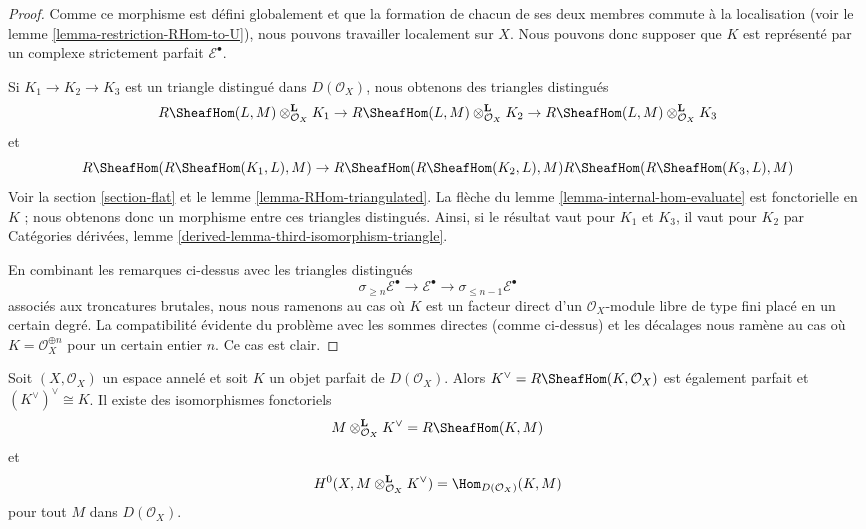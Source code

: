 \begin{proof}
Comme ce morphisme est défini globalement et que la formation de chacun de ses deux membres commute à la localisation (voir le lemme \ref{lemma-restriction-RHom-to-U}), nous pouvons travailler localement sur $X$. Nous pouvons donc supposer que $K$ est représenté par un complexe strictement parfait $\mathcal{E}^\bullet$.

\medskip\noindent
Si $K_1 \to K_2 \to K_3$ est un triangle distingué dans $D(\mathcal{O}_X)$, nous obtenons des triangles distingués $$
R\SheafHom(L, M) \otimes_{\mathcal{O}_X}^\mathbf{L} K_1 \to
R\SheafHom(L, M) \otimes_{\mathcal{O}_X}^\mathbf{L} K_2 \to
R\SheafHom(L, M) \otimes_{\mathcal{O}_X}^\mathbf{L} K_3
$$ et $$
R\SheafHom(R\SheafHom(K_1, L), M) \to
R\SheafHom(R\SheafHom(K_2, L), M)
R\SheafHom(R\SheafHom(K_3, L), M)
$$ Voir la section \ref{section-flat} et le lemme \ref{lemma-RHom-triangulated}. La flèche du lemme \ref{lemma-internal-hom-evaluate} est fonctorielle en $K$ ; nous obtenons donc un morphisme entre ces triangles distingués. Ainsi, si le résultat vaut pour $K_1$ et $K_3$, il vaut pour $K_2$ par Catégories dérivées, lemme \ref{derived-lemma-third-isomorphism-triangle}.

\medskip\noindent
En combinant les remarques ci-dessus avec les triangles distingués $$
\sigma_{\geq n}\mathcal{E}^\bullet \to \mathcal{E}^\bullet \to
\sigma_{\leq n - 1}\mathcal{E}^\bullet
$$ associés aux troncatures brutales, nous nous ramenons au cas où $K$ est un facteur direct d'un $\mathcal{O}_X$-module libre de type fini placé en un certain degré. La compatibilité évidente du problème avec les sommes directes (comme ci-dessus) et les décalages nous ramène au cas où $K = \mathcal{O}_X^{\oplus n}$ pour un certain entier $n$. Ce cas est clair.
\end{proof}

\begin{lemma}

\label{lemma-dual-perfect-complex}
Soit $(X, \mathcal{O}_X)$ un espace annelé et soit $K$ un objet parfait de $D(\mathcal{O}_X)$. Alors $K^\vee = R\SheafHom(K, \mathcal{O}_X)$ est également parfait et $(K^\vee)^\vee \cong K$. Il existe des isomorphismes fonctoriels $$
M \otimes^\mathbf{L}_{\mathcal{O}_X} K^\vee = R\SheafHom(K, M)
$$ et $$
H^0(X, M \otimes^\mathbf{L}_{\mathcal{O}_X} K^\vee) =
\Hom_{D(\mathcal{O}_X)}(K, M)
$$ pour tout $M$ dans $D(\mathcal{O}_X)$.
\end{lemma}

